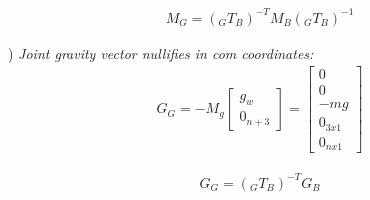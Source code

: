 \documentclass{report}
\newcommand{\mat}[1]{\ensuremath{\begin{bmatrix}#1\end{bmatrix}}}	%
\begin{document}
\begin{align}
M_G = ({}_GT_B)^{-T} M_B ({}_GT_B)^{-1}
\label{fig:}
\end{align}

\quad

) \textit{Joint gravity vector nullifies in com coordinates:}
\begin{align}
G_G = -M_g \mat{g_w \\ 0_{n+3}} = \mat{0 \\0\\ -mg  \\ 0_{3x1} \\0_{nx1} }
\label{fig:}
\end{align}

\begin{align}
G_G =  ({}_GT_B)^{-T} G_B
\label{fig:}
\end{align}
\end{document}
